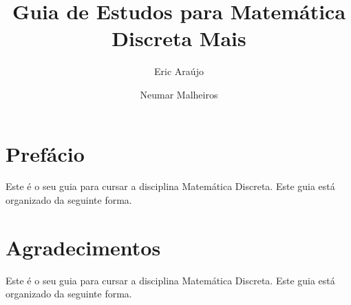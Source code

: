 \documentclass[12pt,a4paper,oneside]{book}
\begin{document}
\pagestyle{empty}
\title{Guia de Estudos para Matem\'atica Discreta Mais}
\author{Eric Ara\'ujo \and Neumar Malheiros}
\maketitle


\pagestyle{fancy}
\fancyhf{}
\lhead[]{\thepage}
\rhead[\thepage]{}


\chapter*{Pref\'acio}

Este \'e o seu guia para cursar a disciplina Matem\'atica Discreta. Este guia est\'a organizado da seguinte forma.

\chapter*{Agradecimentos}

Este \'e o seu guia para cursar a disciplina Matem\'atica Discreta. Este guia est\'a organizado da seguinte forma.

\newpage
\renewcommand{\cftchapdotsep}{\cftdotsep}
\tableofcontents

% 











%




\end{document}
